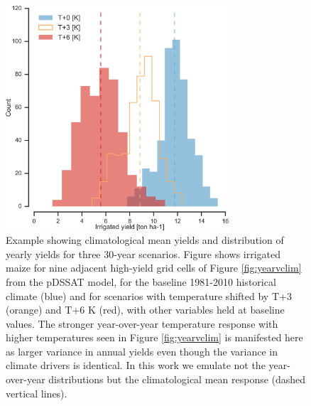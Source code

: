 \documentclass[gmd, manuscript]{copernicus} %
\begin{document}
\begin{figure}[ht]
\centering
   \includegraphics[width=8.3cm]{figures/hist_year.png}
   \caption{Example showing climatological mean yields and distribution of yearly yields for three 30-year scenarios. 
   Figure shows irrigated maize for nine adjacent high-yield grid cells of Figure \ref{fig:yearvclim} from the pDSSAT model, for the baseline 1981-2010 historical climate (blue) and for scenarios with temperature shifted by T+3 (orange) and T+6 K (red), with other variables held at baseline values. 
   The stronger year-over-year temperature response with higher temperatures seen in Figure \ref{fig:yearvclim} is manifested here as larger variance in annual yields even though the variance in climate drivers is identical. 
   In this work we emulate not the year-over-year distributions but the climatological mean response (dashed vertical lines).}
   \label{fig:yearly}
\end{figure}
\end{document}
